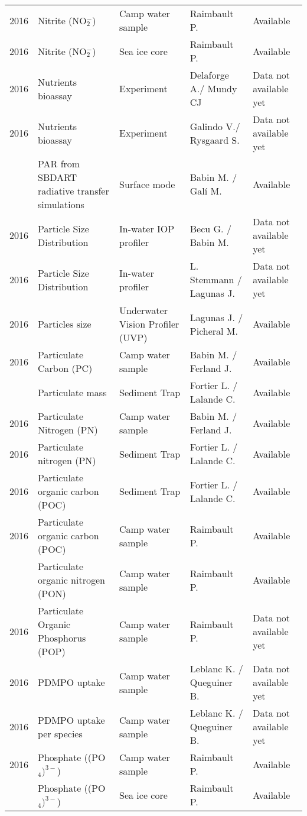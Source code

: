 \documentclass[]{article}
\begin{document}
\begin{landscape}
\begin{longtable}{rllll}
2016 & Nitrite (NO$^-_2$) & Camp water sample & Raimbault P. & Available\\
2016 & Nitrite (NO$^-_2$) & Sea ice core & Raimbault P. & Available\\
2016 & Nutrients bioassay & Experiment & Delaforge A./ Mundy CJ & Data not available yet\\
2016 & Nutrients bioassay & Experiment & Galindo V./ Rysgaard S. & Data not available yet\\
\addlinespace
2016 & PAR from SBDART radiative transfer simulations & Surface mode & Babin M. / Galí M. & Available\\
2016 & Particle Size Distribution & In-water IOP profiler & Becu G. / Babin M. & Data not available yet\\
2016 & Particle Size Distribution & In-water profiler & L. Stemmann / Lagunas J. & Data not available yet\\
2016 & Particles size & Underwater Vision Profiler (UVP) & Lagunas J. / Picheral M. & Available\\
2016 & Particulate Carbon (PC) & Camp water sample & Babin M. / Ferland J. & Available\\
\addlinespace
2016 & Particulate mass & Sediment Trap & Fortier L. / Lalande C. & Available\\
2016 & Particulate Nitrogen (PN) & Camp water sample & Babin M. / Ferland J. & Available\\
2016 & Particulate nitrogen (PN) & Sediment Trap & Fortier L. / Lalande C. & Available\\
2016 & Particulate organic carbon (POC) & Sediment Trap & Fortier L. / Lalande C. & Available\\
2016 & Particulate organic carbon (POC) & Camp water sample & Raimbault P. & Available\\
\addlinespace
2016 & Particulate organic nitrogen (PON) & Camp water sample & Raimbault P. & Available\\
2016 & Particulate Organic Phosphorus (POP) & Camp water sample & Raimbault P. & Data not available yet\\
2016 & PDMPO uptake & Camp water sample & Leblanc K. / Queguiner B. & Data not available yet\\
2016 & PDMPO uptake per species & Camp water sample & Leblanc K. / Queguiner B. & Data not available yet\\
2016 & Phosphate ((PO$_4)^{3-}$) & Camp water sample & Raimbault P. & Available\\
\addlinespace
2016 & Phosphate ((PO$_4)^{3-}$) & Sea ice core & Raimbault P. & Available\\

\end{longtable}
\end{landscape}
\end{document}
